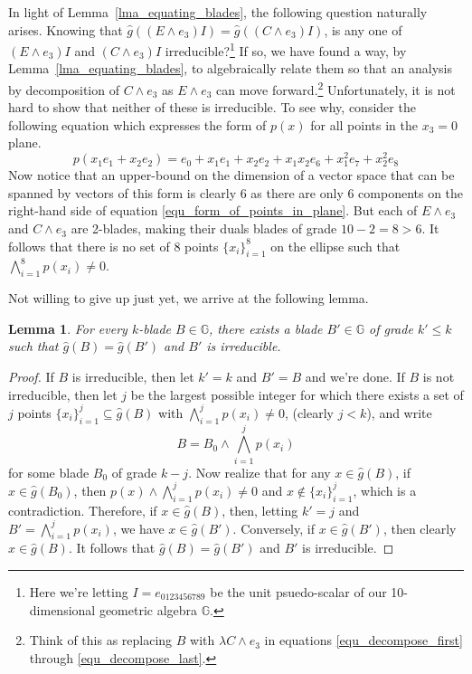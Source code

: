 \documentclass{birkjour}
\newtheorem{lem}[thm]{Lemma}
\theoremstyle{definition}
\theoremstyle{remark}
\numberwithin{equation}{section}
\newcommand{\G}{\mathbb{G}}
\newcommand{\gh}{\hat{g}}
\begin{document}
In light of Lemma~\ref{lma_equating_blades}, the following question naturally arises.
Knowing that $\gh((E\wedge e_3)I)=\gh((C\wedge e_3)I)$, is any one of
$(E\wedge e_3)I$ and $(C\wedge e_3)I$ irreducible?\footnote{Here we're letting $I=e_{0123456789}$
be the unit psuedo-scalar of our 10-dimensional geometric algebra $\G$.}  If so, we have found
a way, by Lemma~\ref{lma_equating_blades}, to algebraically relate them so that an analysis
by decomposition of $C\wedge e_3$
as $E\wedge e_3$ can move forward.\footnote{Think of this as replacing
$B$ with $\lambda C\wedge e_3$ in equations \eqref{equ_decompose_first} through
\eqref{equ_decompose_last}.}
Unfortunately, it is not hard to show
that neither of these is irreducible.  To see why, consider the following equation which
expresses the form of $p(x)$ for all points in the $x_3=0$ plane.
\begin{equation}\label{equ_form_of_points_in_plane}
p(x_1e_1 + x_2e_2) = e_0 + x_1e_1 + x_2e_2 + x_1x_2e_6 + x_1^2e_7 + x_2^2e_8
\end{equation}
Now notice that an upper-bound on the dimension of a vector space that can
be spanned by vectors of this form is clearly 6 as there are only 6 components
on the right-hand side of equation \eqref{equ_form_of_points_in_plane}.
But each of $E\wedge e_3$ and $C\wedge e_3$ are 2-blades, making their
duals blades of grade $10-2=8>6$.  It follows that there is no set of 8 points $\{x_i\}_{i=1}^8$
on the ellipse such that $\bigwedge_{i=1}^8 p(x_i)\neq 0$.

Not willing to give up just yet, we arrive at the following lemma.

\begin{lem}\label{lma_irreducible_form_exists}
For every $k$-blade $B\in\G$, there exists a blade $B'\in\G$ of grade $k'\leq k$
such that $\gh(B)=\gh(B')$ and $B'$ is irreducible.
\end{lem}
\begin{proof}
If $B$ is irreducible, then let $k'=k$ and $B'=B$ and we're done.
If $B$ is not irreducible, then let $j$ be the largest possible integer
for which there exists a set of $j$ points $\{x_i\}_{i=1}^j\subseteq\gh(B)$
with $\bigwedge_{i=1}^j p(x_i)\neq 0$, (clearly $j<k$), and write
\begin{equation*}
B = B_0\wedge\bigwedge_{i=1}^j p(x_i)
\end{equation*}
for some blade $B_0$ of grade $k-j$.  Now realize that for any $x\in\gh(B)$,
if $x\in\gh(B_0)$, then $p(x)\wedge\bigwedge_{i=1}^j p(x_i)\neq 0$ and $x\not\in\{x_i\}_{i=1}^j$,
which is a contradiction.  Therefore, if $x\in\gh(B)$, then, letting $k'=j$ and $B'=\bigwedge_{i=1}^jp(x_i)$,
we have $x\in\gh(B')$.  Conversely, if $x\in\gh(B')$, then clearly $x\in\gh(B)$.  It follows that
$\gh(B)=\gh(B')$ and $B'$ is irreducible.
\end{proof}
\end{document}
